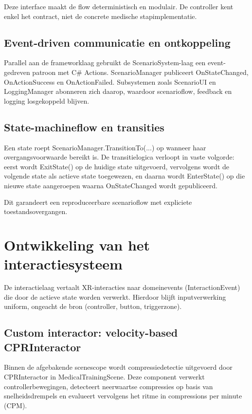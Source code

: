 Deze interface maakt de flow deterministisch en modulair. De controller kent enkel het contract, niet de concrete medische stapimplementatie.

\subsection{Event-driven communicatie en ontkoppeling}

Parallel aan de frameworklaag gebruikt de ScenarioSystem-laag een event-gedreven patroon met C\# Actions. ScenarioManager publiceert OnStateChanged, OnActionSuccess en OnActionFailed. Subsystemen zoals ScenarioUI en LoggingManager abonneren zich daarop, waardoor scenarioflow, feedback en logging losgekoppeld blijven.

\subsection{State-machineflow en transities}

Een state roept ScenarioManager.TransitionTo(...) op wanneer haar overgangsvoorwaarde bereikt is. De transitielogica verloopt in vaste volgorde:
eerst wordt ExitState() op de huidige state uitgevoerd, vervolgens wordt de volgende state als actieve state toegewezen, en daarna wordt EnterState() op die nieuwe state aangeroepen waarna OnStateChanged wordt gepubliceerd.

Dit garandeert een reproduceerbare scenarioflow met expliciete toestandsovergangen.

\section{Ontwikkeling van het interactiesysteem}

De interactielaag vertaalt XR-interacties naar domeinevents (InteractionEvent) die door de actieve state worden verwerkt. Hierdoor blijft inputverwerking uniform, ongeacht de bron (controller, button, triggerzone).

\subsection{Custom interactor: velocity-based CPRInteractor}

Binnen de afgebakende scenescope wordt compressiedetectie uitgevoerd door CPRInteractor in MedicalTrainingScene. Deze component verwerkt controllerbewegingen, detecteert neerwaartse compressies op basis van snelheidsdrempels en evalueert vervolgens het ritme in compressions per minute (CPM).

